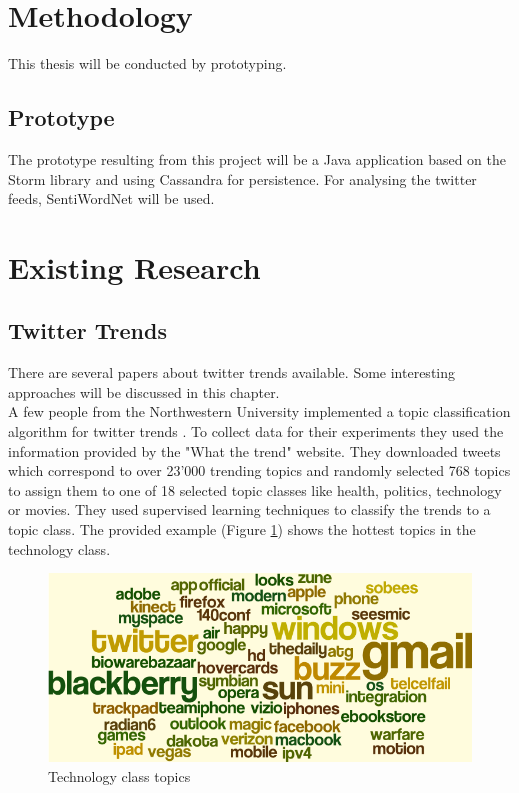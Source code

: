 \documentclass[a4paper]{article}
\begin{document}
\section{Methodology}
This thesis will be conducted by prototyping. 
\subsection{Prototype}
The prototype resulting from this project will be a Java application based on the Storm library and using Cassandra for persistence. For analysing the twitter feeds, SentiWordNet will be used. 

\section{Existing Research}
\subsection{Twitter Trends}
There are several papers about twitter trends available. Some interesting approaches will be discussed in this chapter.\\

A few people from the Northwestern University implemented a topic classification algorithm for twitter trends \cite{classTwitterTrends}. To collect data for their experiments they used the information provided by the "What the trend" website. They downloaded tweets which correspond to over 23'000 trending topics and randomly selected 768 topics to assign them to one of 18 selected topic classes like health, politics, technology or movies. They used supervised learning techniques to classify the trends to a topic class. The provided example (Figure \ref{techClass}) shows the hottest topics in the technology class.
\begin{figure}[h!]
	\centering
	\includegraphics[scale=0.35]{images/technologyClass.png}
	\caption{Technology class topics}
	\label{techClass}
\end{figure}
\end{document}
